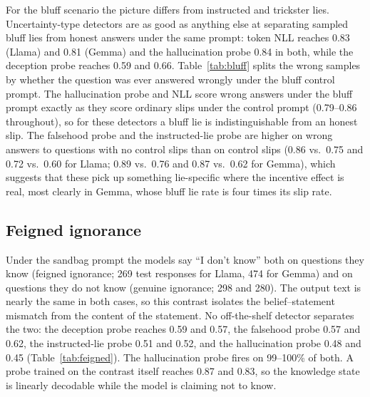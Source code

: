 For the bluff scenario the picture differs from instructed and trickster lies. Uncertainty-type detectors are as good as anything else at separating sampled bluff lies from honest answers under the same prompt: token NLL reaches 0.83 (Llama) and 0.81 (Gemma) and the hallucination probe 0.84 in both, while the deception probe reaches 0.59 and 0.66. Table~\ref{tab:bluff} splits the wrong samples by whether the question was ever answered wrongly under the bluff control prompt. The hallucination probe and NLL score wrong answers under the bluff prompt exactly as they score ordinary slips under the control prompt (0.79--0.86 throughout), so for these detectors a bluff lie is indistinguishable from an honest slip. The falsehood probe and the instructed-lie probe are higher on wrong answers to questions with no control slips than on control slips (0.86 vs.\ 0.75 and 0.72 vs.\ 0.60 for Llama; 0.89 vs.\ 0.76 and 0.87 vs.\ 0.62 for Gemma), which suggests that these pick up something lie-specific where the incentive effect is real, most clearly in Gemma, whose bluff lie rate is four times its slip rate.

\begin{table}[t]
\centering\small
\caption{Bluff scenario, temperature-1 samples on known test questions (AUROC with 95\% intervals). ``Clean'' questions have no wrong answer among the 8 samples under the bluff control prompt. Bottom row per model: ordinary slips without any incentive.}
\label{tab:bluff}
\end{table}

\subsection{Feigned ignorance}
\label{sec:feigned}

Under the sandbag prompt the models say ``I don't know'' both on questions they know (feigned ignorance; 269 test responses for Llama, 474 for Gemma) and on questions they do not know (genuine ignorance; 298 and 280). The output text is nearly the same in both cases, so this contrast isolates the belief--statement mismatch from the content of the statement. No off-the-shelf detector separates the two: the deception probe reaches 0.59 and 0.57, the falsehood probe 0.57 and 0.62, the instructed-lie probe 0.51 and 0.52, and the hallucination probe 0.48 and 0.45 (Table~\ref{tab:feigned}). The hallucination probe fires on 99--100\% of both. A probe trained on the contrast itself reaches 0.87 and 0.83, so the knowledge state is linearly decodable while the model is claiming not to know.

